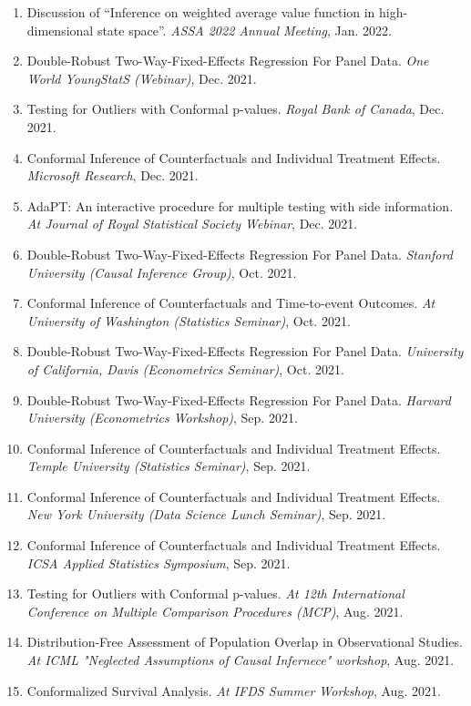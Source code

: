 \documentclass{article}
\begin{document}
\begin{enumerate}
\item Discussion of ``Inference on weighted average value function in high-dimensional state space''. \emph{ASSA 2022 Annual Meeting}, Jan. 2022.
\item Double-Robust Two-Way-Fixed-Effects Regression For Panel Data. \emph{One World YoungStatS (Webinar)}, Dec. 2021.
\item Testing for Outliers with Conformal p-values. \emph{Royal Bank of Canada}, Dec. 2021.  
\item Conformal Inference of Counterfactuals and Individual Treatment Effects. \emph{Microsoft Research}, Dec. 2021.
\item AdaPT: An interactive procedure for multiple testing with side information. \emph{At Journal of Royal Statistical Society Webinar}, Dec. 2021.
\item Double-Robust Two-Way-Fixed-Effects Regression For Panel Data. \emph{Stanford University (Causal Inference Group)}, Oct. 2021.
\item Conformal Inference of Counterfactuals and Time-to-event Outcomes. \emph{At University of Washington (Statistics Seminar)}, Oct. 2021.
\item Double-Robust Two-Way-Fixed-Effects Regression For Panel Data. \emph{University of California, Davis (Econometrics Seminar)}, Oct. 2021.
\item Double-Robust Two-Way-Fixed-Effects Regression For Panel Data. \emph{Harvard University (Econometrics Workshop)}, Sep. 2021.
\item Conformal Inference of Counterfactuals and Individual Treatment Effects. \emph{Temple University (Statistics Seminar)}, Sep. 2021.
\item Conformal Inference of Counterfactuals and Individual Treatment Effects. \emph{New York University (Data Science Lunch Seminar)}, Sep. 2021.
\item Conformal Inference of Counterfactuals and Individual Treatment Effects. \emph{ICSA Applied Statistics Symposium}, Sep. 2021.
\item Testing for Outliers with Conformal p-values. \emph{At 12th International Conference on Multiple Comparison Procedures (MCP)}, Aug. 2021.
\item Distribution-Free Assessment of Population Overlap in Observational Studies. \emph{At ICML "Neglected Assumptions of Causal Infernece" workshop}, Aug. 2021.
\item Conformalized Survival Analysis. \emph{At IFDS Summer Workshop}, Aug. 2021.

\end{enumerate}
\end{document}
